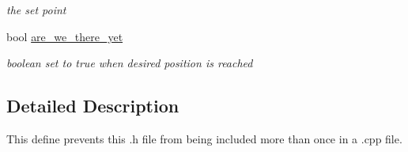 \begin{DoxyCompactItemize}
\begin{DoxyCompactList}\small\item\em the set point \end{DoxyCompactList}\item 
\hypertarget{classtask___p_i_d_a9d046f072b58189aed139ea63d853fd4}{bool \hyperlink{classtask___p_i_d_a9d046f072b58189aed139ea63d853fd4}{are\-\_\-we\-\_\-there\-\_\-yet}}\label{classtask___p_i_d_a9d046f072b58189aed139ea63d853fd4}

\begin{DoxyCompactList}\small\item\em boolean set to true when desired position is reached \end{DoxyCompactList}\end{DoxyCompactItemize}


\subsection{Detailed Description}
This define prevents this .h file from being included more than once in a .cpp file. 

